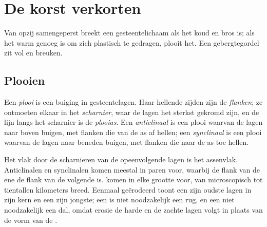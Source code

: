 \section{De korst verkorten}

Van opzij samengeperst breekt een gesteentelichaam als het koud en bros is; als
het warm genoeg is om zich plastisch te gedragen, plooit het. Een gebergtegordel zit
vol  en breuken.

\subsection{Plooien}

\begin{definition}\label{def:g12:mountain-building:fold}
Een \emph{plooi} is een buiging in gesteentelagen. Haar hellende zijden zijn
de \emph{flanken}; ze ontmoeten elkaar in het \emph{scharnier}, waar de lagen het sterkst
gekromd zijn, en de lijn langs het scharnier is de
\emph{plooias}. Een \emph{anticlinaal} is een plooi waarvan de lagen
naar boven buigen, met flanken die van de as af hellen; een
\emph{synclinaal} is een plooi waarvan de lagen naar beneden buigen, met
flanken die naar de as toe hellen.
\end{definition}

Het vlak door de scharnieren van de opeenvolgende lagen is het assenvlak.
Anticlinalen en synclinalen komen meestal in paren voor, waarbij de flank van de ene de
flank van de volgende is.  komen in elke grootte voor, van microscopisch tot tientallen
kilometers breed. Eenmaal geërodeerd toont een  zijn oudste lagen in
zijn kern en een  zijn jongste; een  is niet noodzakelijk een
rug, en een  niet noodzakelijk een dal, omdat erosie de harde en de
zachte lagen volgt in plaats van de vorm van de .

